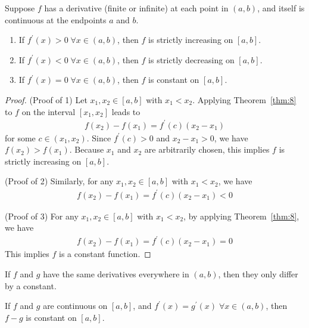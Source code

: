 \documentclass[thmcnt=section, 12pt]{my-elegantbook}
\begin{document}
\begin{theorem} \label{thm:10}
    Suppose $f$ has a derivative (finite or infinite) at each point in $(a, b)$, and itself is continuous at the endpoints $a$ and $b$.
    \begin{enumerate}
        \item If $f^\prime(x) > 0 \; \forall x \in (a, b)$, then $f$ is strictly increasing on $[a, b]$.
        \item If $f^\prime(x) < 0 \; \forall x \in (a, b)$, then $f$ is strictly decreasing on $[a, b]$.
        \item If $f^\prime(x) = 0 \; \forall x \in (a, b)$, then $f$ is constant on $[a, b]$.
    \end{enumerate}
\end{theorem}

\begin{proof}
    (Proof of 1) Let $x_1, x_2 \in [a, b]$ with $x_1 < x_2$. Applying Theorem~\ref{thm:8} to $f$ on the interval $[x_1, x_2]$ leads to 
    \begin{align*}
        f(x_2) - f(x_1) = f^\prime(c) (x_2 - x_1)
    \end{align*}
    for some $c \in (x_1, x_2)$. Since $f^\prime(c) > 0$ and $x_2 - x_1 > 0$, we have $f(x_2) > f(x_1)$. Because $x_1$ and $x_2$ are arbitrarily chosen, this implies $f$ is strictly increasing on $[a, b]$.

    (Proof of 2) Similarly, for any $x_1, x_2 \in [a, b]$ with $x_1 < x_2$, we have 
    \begin{align*}
        f(x_2) - f(x_1) = f^\prime(c) (x_2 - x_1) < 0
    \end{align*}

    (Proof of 3) For any $x_1, x_2 \in [a, b]$ with $x_1 < x_2$, by applying Theorem~\ref{thm:8}, we have
    \begin{align*}
        f(x_2) - f(x_1) = f^\prime(c) (x_2 - x_1) = 0
    \end{align*}
    This implies $f$ is a constant function.
\end{proof}

\par If $f$ and $g$ have the same derivatives everywhere in $(a, b)$, then they only differ by a constant. 

\begin{corollary}
    If $f$ and $g$ are continuous on $[a, b]$, and $f^\prime(x) = g^\prime(x) \; \forall x \in (a, b)$, then $f - g$ is constant on $[a, b]$.
\end{corollary}
\end{document}
